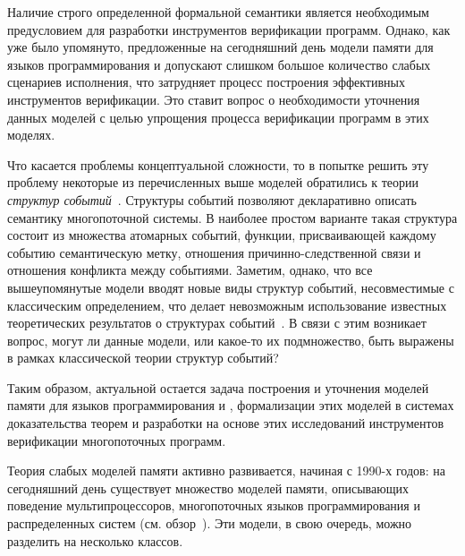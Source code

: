 Наличие строго определенной формальной семантики является необходимым
предусловием для разработки инструментов верификации программ.
Однако, как уже было упомянуто, предложенные на сегодняшний день модели памяти для языков
программирования \CPP и \Java допускают слишком большое количество
слабых сценариев исполнения, что затрудняет  
процесс построения эффективных инструментов верификации.
Это ставит вопрос о необходимости уточнения данных моделей
с целью упрощения процесса верификации программ в этих моделях.

Что касается проблемы концептуальной сложности, 
то в попытке решить эту проблему некоторые
из перечисленных выше моделей обратились к
теории \emph{структур событий}~\autocite{Winskel:86}.
Структуры событий позволяют декларативно описать семантику многопоточной системы.
В наиболее простом варианте такая структура состоит из множества атомарных событий,
функции, присваивающей каждому событию семантическую метку, 
отношения причинно-следственной связи и отношения конфликта между событиями.
Заметим, однако, что все вышеупомянутые модели вводят новые виды структур событий,
несовместимые с классическим определением, что делает
невозможным использование известных теоретических результатов
о структурах событий~\autocite{Vaandrager:TCS1991,Sassone:MFCS1993,Nielsen:REX93,Winskel-TCS:09}.
В связи с этим возникает вопрос, могут ли данные модели,
или какое-то их подмножество, быть выражены
в рамках классической теории структур событий?

Таким образом, актуальной остается задача построения и уточнения 
моделей памяти для языков программирования \CPP и \Java,
формализации этих моделей в системах доказательства теорем
и разработки на основе этих исследований инструментов верификации многопоточных программ.

{\progress}

Теория слабых моделей памяти активно развивается, начиная с 1990-х годов: 
на сегодняшний день существует множество моделей памяти, 
описывающих поведение мультипроцессоров, 
многопоточных языков программирования и распределенных систем 
(см. обзор~\cite{Moiseenko-al:PCS21}). 
Эти модели, в свою очередь, можно разделить на несколько классов.

